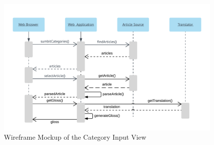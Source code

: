 \begin{figure}
	\caption{Wireframe Mockup of the Category Input View}
	\label{fig:sf}
	\includegraphics[width=\textwidth]{Graphics/SystemsFlow}
\end{figure}